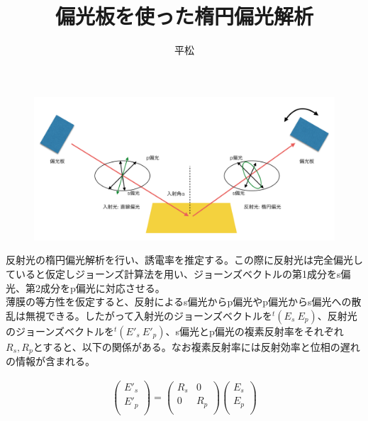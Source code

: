 \documentclass[11pt]{article}
\begin{document}
\title{偏光板を使った楕円偏光解析}
\author{平松}
\maketitle

\begin{figure}[htbp]
\centering
  \includegraphics[width=13cm]{./schematics}
\end{figure}

反射光の楕円偏光解析を行い、誘電率を推定する。この際に反射光は完全偏光していると仮定しジョーンズ計算法を用い、ジョーンズベクトルの第1成分をs偏光、第2成分をp偏光に対応させる。\\

薄膜の等方性を仮定すると、反射によるs偏光からp偏光やp偏光からs偏光への散乱は無視できる。したがって入射光のジョーンズベクトルを$^t(E_s\ E_p)$、反射光のジョーンズベクトルを$^t(E'_s\ E'_p)$、s偏光とp偏光の複素反射率をそれぞれ$R_s, R_p$とすると、以下の関係がある。なお複素反射率には反射効率と位相の遅れの情報が含まれる。

\begin{eqnarray*}
  \left(
    \begin{array}{c}
      E'_s \\
      E'_p \\
    \end{array} 
  \right) 
  =
  \left(
    \begin{array}{cc}
      R_s & 0 \\
      0 & R_p \\
    \end{array}
  \right)
  \left(
    \begin{array}{c}
      E_s \\
      E_p \\
    \end{array}
  \right) \\
  \end{eqnarray*}
  
\end{document}
